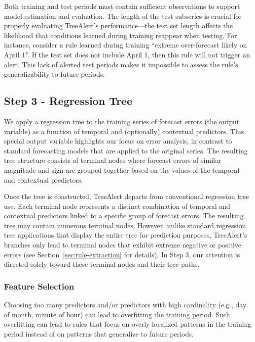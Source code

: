 \documentclass[12pt]{article}
\begin{document}

Both training and test periods must contain sufficient observations to support model estimation and evaluation.
The length of the test subseries is crucial for properly evaluating TreeAlert's performance---the test set length affects %
the likelihood that conditions learned during training reappear when testing. For instance, consider a rule learned during training ``extreme over-forecast likely on April 1''. If the test set does not include April 1, then this rule will not trigger an alert. This lack of alerted test periods makes it impossible to assess the rule's generalizability to future periods.

\subsection{Step 3 - Regression Tree}
We apply a regression tree to the training series of forecast errors (the output variable) as a function of temporal and (optionally) contextual predictors. This special output variable highlights our focus on error analysis, in contrast to standard forecasting models that are applied to the original series. The resulting tree structure consists of terminal nodes where forecast errors of similar magnitude and sign are grouped together based on the values of the temporal and contextual predictors. 

Once the tree is constructed, TreeAlert departs from conventional regression tree use. Each terminal node represents a distinct combination of temporal and contextual predictors linked to a specific group of forecast errors. The resulting tree may contain numerous terminal nodes. However, unlike standard regression tree applications that display the entire tree for prediction purposes, TreeAlert’s branches only lead to terminal nodes that exhibit extreme negative or positive errors (see Section~\ref{sec:rule-extraction} for details). In Step 3, our attention is directed solely toward these terminal nodes and their tree paths.

\subsubsection{Feature Selection}
Choosing too many predictors and/or predictors with high cardinality (e.g., day of month, minute of hour) can lead to overfitting the training period. Such overfitting can lead to rules that focus on overly localized patterns in the training period instead of on patterns that generalize to future periods. 
\end{document}

